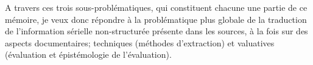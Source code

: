 A travers ces trois sous-problématiques, qui constituent chacune une partie de ce mémoire, je veux donc répondre à la problématique plus globale de la traduction de l'information sérielle non-structurée présente dans les sources, à la fois sur des aspects documentaires; techniques (méthodes d'extraction) et valuatives (évaluation et épistémologie de l'évaluation).

